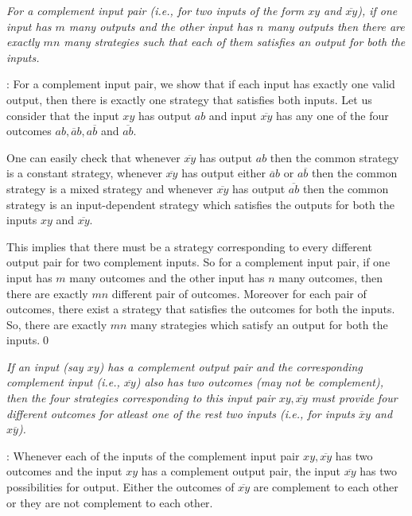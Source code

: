 \documentclass[]{svjour3}
\begin{document}
\begin{theorem}
	\label{thm2}
	{\it For a complement input pair (i.e., for two inputs of the form $xy$ and $\overline{xy}$), if one input has $m$ many outputs and the other input has $n$ many outputs then there are exactly $mn$ many strategies such that each of them satisfies an output for both the inputs.}
\end{theorem}
\proof :
For a complement input pair, we show that if each
input has exactly one valid output, then there is exactly one
strategy that satisfies both inputs. Let us consider that the input $xy$ has output $ab$ and input $\overline{xy}$ has any one of the four outcomes $ab, \overline{a}b, a\overline{b}$ and $\overline{ab}$.

One can easily check that whenever $\overline{xy}$ has output $ab$ then the common strategy is a constant strategy, whenever $\overline{xy}$ has output either $\overline{a}b$ or $a\overline{b}$ then the common strategy is a mixed strategy and whenever $\overline{xy}$ has output $\overline{ab}$ then the common strategy is an input-dependent strategy which satisfies the outputs for both the inputs $xy$ and $\overline{xy}$.

This implies that there must be a strategy corresponding to every different output pair for two complement inputs. So for a complement input pair, if one input has $m$ many outcomes and the other input has $n$ many outcomes, then there are exactly $mn$ different pair of outcomes. Moreover for each pair of outcomes, there exist a strategy that satisfies the outcomes for both the inputs. So, there are exactly $mn$ many strategies which satisfy an output for both the inputs.\qed

\noindent


\begin{theorem}
	\label{thm5}
	{\it If an input (say $xy$) has a complement output pair and the corresponding complement input (i.e., $\overline{xy}$) also has two outcomes (may not be complement), then the four strategies corresponding to this input pair $xy, \overline{xy}$ must provide four different outcomes for atleast one of the rest two inputs (i.e., for inputs $\overline{x}y$ and $x\overline{y}$).}
\end{theorem}
\proof :
Whenever each of the inputs of the complement input pair $xy, \overline{xy}$ has two outcomes and the input $xy$ has a complement output pair, the input $\overline{xy}$ has two possibilities for output. Either the outcomes of $\overline{xy}$ are complement to each other or they are not complement to each other.
\end{document}

